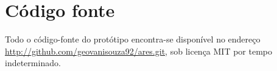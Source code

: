 \chapter{C\'odigo fonte}
\label{tcc:codigo}

Todo o código-fonte do protótipo encontra-se disponível no endereço \url{http://github.com/geovanisouza92/ares.git}, sob licença MIT por tempo indeterminado.
